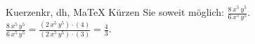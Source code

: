 \begin{MAufgabe}{Kuerzen}{kr, dh, MaTeX}
K\"urzen Sie soweit m\"oglich: $\frac{8\, x^5\, y^5}{6\, x^5\, y^5}$.\\ 
\ifLsg\MLoesung
\quad $\frac{8\, x^5\, y^5}{6\, x^5\, y^5}=\frac{(2\, x^5\, y^5)\cdot(4)}{(2\, x^5\, y^5)\cdot(3)}=\frac{4}{3}$.\else\relax\fi
 \end{MAufgabe}
